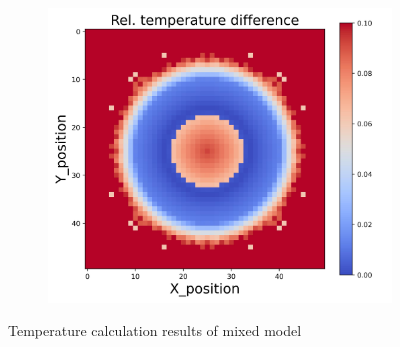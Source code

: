 \begin{figure}[h]
\begin{minipage}{\textwidth}
\begin{subfigure}{0.3\textwidth}
        \end{subfigure}
        \begin{subfigure}{0.3\textwidth}
            \centering
            \includegraphics[width=\textwidth]{figures/raw_data/33/mix/T_bias.jpg}
        \end{subfigure}
    \end{minipage}
    \caption{Temperature calculation results of mixed model}  
\end{figure}
